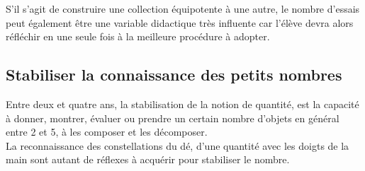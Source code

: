    S'il s'agit de construire une collection équipotente à une autre, le nombre d'essais peut également être une variable didactique très influente car l'élève devra alors réfléchir en une seule fois à la meilleure procédure à adopter.

\subsection{Stabiliser la connaissance des petits nombres}

   Entre deux et quatre ans, la stabilisation de la notion de quantité, est la capacité à donner, montrer, évaluer ou prendre un certain nombre d'objets en général entre 2 et 5, à les composer et les décomposer. \\
La reconnaissance des constellations du dé, d’une quantité avec les doigts de la main sont autant de réflexes à acquérir pour stabiliser le nombre.
